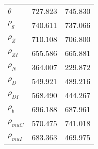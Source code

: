 \begin{center}
\begin{longtable}{lcc}
$ {\theta}             $	 & 	     727.823	 & 	     745.830 \\ 
$ {\rho_g}             $	 & 	     740.611	 & 	     737.066 \\ 
$ {\rho_Z}             $	 & 	     710.108	 & 	     706.800 \\ 
$ {\rho_{ZI}}          $	 & 	     655.586	 & 	     665.881 \\ 
$ {\rho_N}             $	 & 	     364.007	 & 	     229.872 \\ 
$ {\rho_D}             $	 & 	     549.921	 & 	     489.216 \\ 
$ {\rho_{DI}}          $	 & 	     568.490	 & 	     444.267 \\ 
$ {\rho_b}             $	 & 	     696.188	 & 	     687.961 \\ 
$ {\rho_{muC}}         $	 & 	     570.475	 & 	     741.018 \\ 
$ {\rho_{muI}}         $	 & 	     683.363	 & 	     469.975 \\ 
\end{longtable}
 \end{center}
